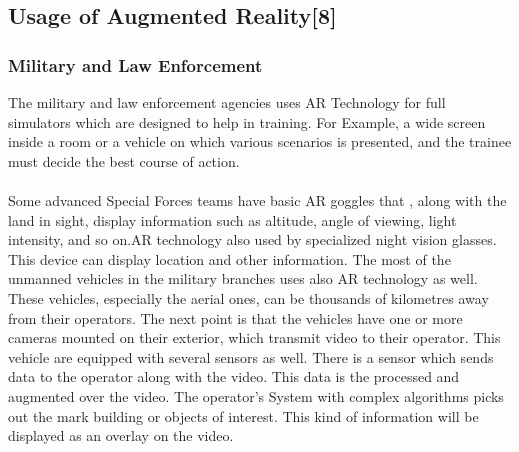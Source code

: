 \subsection{Usage of Augmented Reality[8]}
\subsubsection{Military and Law Enforcement }
The military and law enforcement agencies uses  AR Technology for  full simulators which are designed to help in training.  For Example, a wide screen inside a room or a vehicle on which various scenarios is presented, and the trainee must decide the best course of action.
\\
\\
Some advanced Special Forces teams have basic AR goggles that , along with the land in sight, display information such as altitude, angle of viewing, light intensity, and so on.AR technology also used by specialized night vision glasses. This device can display location and other information. The most of the unmanned vehicles in the military branches uses also AR technology as well. These vehicles, especially the aerial ones, can be thousands of kilometres away from their operators. The next point is that the vehicles have one or more cameras mounted on their exterior, which transmit video to their operator. This vehicle are equipped with several sensors as well. There is a sensor which sends data to the operator along with the video. This data is the processed and augmented over the video.  The operator’s System with complex algorithms picks out the mark building or objects of interest. This kind of information will be displayed as an overlay on the video.
\\
\\
